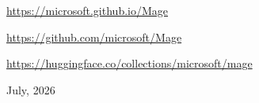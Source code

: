 \documentclass[11pt]{article}
\begin{document}
\vspace{0.45em}
\begin{msfttitlebox}
\setlength{\parindent}{0cm}
\setlength{\parskip}{0cm}



\vspace{0.14cm}
{\setlength{\parskip}{0.06cm}\small
{\href{https://microsoft.github.io/Mage}{https://microsoft.github.io/Mage}\par}
{\href{https://github.com/microsoft/Mage}{https://github.com/microsoft/Mage}\par}
{\href{https://huggingface.co/collections/microsoft/mage}{https://huggingface.co/collections/microsoft/mage}\par}
{July, 2026\par}                %
}

\end{msfttitlebox}
\suppressfloats[t]  %













\newpage
\FloatBarrier  %


\end{document}
